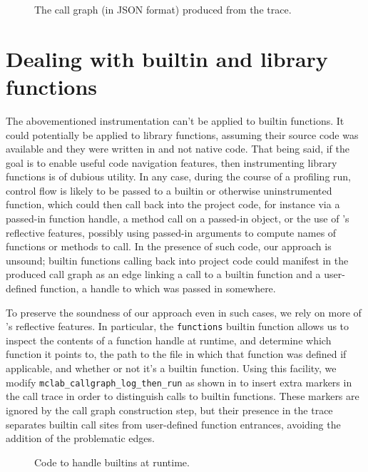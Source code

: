 \begin{figure}[htbp]

\caption{The call graph (in JSON format) produced from the trace.}
\label{Fig:Callgraph}
\end{figure}

\section{Dealing with builtin and library functions}

The abovementioned instrumentation can't be applied to \matlab builtin
functions. It could potentially be applied to library functions, assuming their
source code was available and they were written in \matlab and not native code.
That being said, if the goal is to enable useful code navigation features, then
instrumenting library functions is of dubious utility. In any case, during the
course of a profiling run, control flow is likely to be passed to a builtin or
otherwise uninstrumented function, which could then call back into the project
code, for instance via a passed-in function handle, a method call on a
passed-in object, or the use of \matlab's reflective features, possibly using
passed-in arguments to compute names of functions or methods to call. In the
presence of such code, our approach is unsound; builtin functions calling back
into project code could manifest in the produced call graph as an edge linking
a call to a builtin function and a user-defined function, a handle to which was
passed in somewhere.

To preserve the soundness of our approach even in such cases, we rely on more
of \matlab's reflective features. In particular, the \texttt{functions} builtin
function allows us to inspect the contents of a function handle at runtime, and
determine which function it points to, the path to the file in which that
function was defined if applicable, and whether or not it's a builtin function.
Using this facility, we modify \texttt{mclab\_callgraph\_log\_then\_run} as
shown in  to insert extra markers in the call
trace in order to distinguish calls to builtin functions. These markers are
ignored by the call graph construction step, but their presence in the trace
separates builtin call sites from user-defined function entrances, avoiding
the addition of the problematic edges.

\begin{figure}[htbp]
  
\caption{Code to handle builtins at runtime.}
\label{Fig:LogThenRunBuiltin}
\end{figure}


